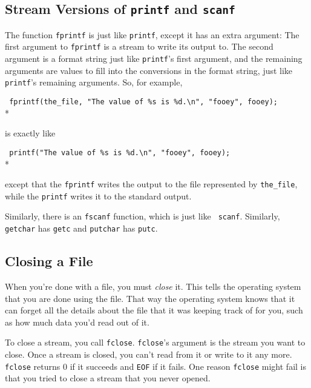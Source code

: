 \subsection{Stream Versions of {\tt printf} and {\tt scanf}}

The function {\tt fprintf} is just like {\tt printf}, except it has an
extra argument:  The first argument to {\tt fprintf} is a stream to
write its output to.  The second argument is a format string just like
{\tt printf}'s first argument, and the remaining arguments are values to
fill into the conversions in the format string, just like {\tt printf}'s
remaining arguments.  So, for example,

\begin{flushleft}
\verb! fprintf(the_file, "The value of %s is %d.\n", "fooey", fooey); ! \\*
\end{flushleft}

\noindent is exactly like 

\begin{flushleft}
\verb! printf("The value of %s is %d.\n", "fooey", fooey); ! \\*
\end{flushleft}

\noindent except that the {\tt fprintf} writes the output to the file
represented by {\tt the\_file}, while the {\tt printf} writes it to the
standard output.

Similarly, there is an {\tt fscanf} function, which is just like {\tt
scanf}.  Similarly, {\tt getchar} has {\tt getc} and {\tt putchar} has
{\tt putc}.  

\subsection{Closing a File}

When you're done with a file, you must {\em close}\/ it.  This tells the
operating system that you are done using the file.  That way the
operating system knows that it can forget all the details about the file
that it was keeping track of for you, such as how much data you'd read
out of it.  

To close a stream, you call {\tt fclose}.  {\tt fclose}'s argument is
the stream you want to close.  Once a stream is closed, you can't read
from it or write to it any more.  {\tt fclose} returns 0 if it succeeds
and {\tt EOF} if it fails.  One reason {\tt fclose} might fail is that
you tried to close a stream that you never opened.

